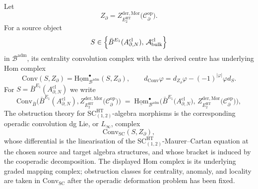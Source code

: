\begin{defn}\label{defn:convolution-complex}
Let
\[
  Z_\partial =
  Z^{\mathrm{der},\mathrm{Mor}}_{E_2^{\mathrm{HT}}}\!\bigl(
    \mathcal C^{\mathrm{op}}_\partial\bigr).
\]
For a source object
\[
  S\in\Bigl\{
  \bar B^{E_1}(A^{\mathrm{cl}}_{\partial,N}),\,
  \mathcal A^{\mathrm{cl}}_{\mathrm{bulk}}\Bigr\}
\]
in \(\mathcal B^{\mathrm{adm}}\), its centrality convolution complex
with the derived centre has underlying Hom complex
\[
  \mathrm{Conv}(S,Z_\partial)
  =
  \underline{\mathrm{Hom}}_{\mathcal B^{\mathrm{adm}}}^\bullet(S,Z_\partial),
  \qquad
  d_{\mathrm{Conv}}\varphi
  =
  d_{Z_\partial}\varphi-(-1)^{|\varphi|}\varphi d_S .
\]
For \(S=\bar B^{E_1}(A^{\mathrm{cl}}_{\partial,N})\) we write
\begin{equation}\label{eq:convolution-complex-def}
	  \mathrm{Conv}_{\bar B}\!\bigl(
	    \bar B^{E_1}(A^{\mathrm{cl}}_{\partial,N}),
    Z^{\mathrm{der},\mathrm{Mor}}_{E_2^{\mathrm{HT}}}\!\bigl(
      \mathcal C^{\mathrm{op}}_\partial\bigr)\bigr)
   \;=\;
   \underline{\mathrm{Hom}}_{\mathcal B^{\mathrm{adm}}}^\bullet\!\bigl(
     \bar B^{E_1}\!\bigl(A^{\mathrm{cl}}_{\partial,N}\bigr),\,
     Z^{\mathrm{der},\mathrm{Mor}}_{E_2^{\mathrm{HT}}}\!\bigl(
       \mathcal C^{\mathrm{op}}_\partial\bigr)\bigr),
\end{equation}
The obstruction theory for \(\mathrm{SC}^{\mathrm{HT}}_{(1,2)}\)-algebra
morphisms is the corresponding operadic convolution dg Lie, or
\(L_\infty\), complex
\[
  \mathrm{Conv}_{\mathrm{SC}}(S,Z_\partial),
\]
whose differential is the linearisation of the
\(\mathrm{SC}^{\mathrm{HT}}_{(1,2)}\)-Maurer--Cartan equation at the
chosen source and target algebra structures, and whose bracket is induced
by the cooperadic decomposition.  The displayed Hom complex is its
underlying graded mapping complex; obstruction classes for centrality,
anomaly, and locality are taken in
\(\mathrm{Conv}_{\mathrm{SC}}\) after the operadic deformation problem has
been fixed.
\end{defn}

